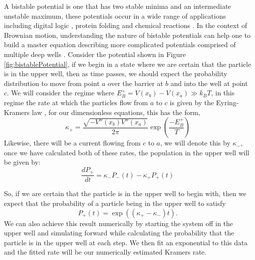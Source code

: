 A bistable potential is one that has two stable minima and an intermediate unstable maximum, these potentials occur in a wide range of applications including digital logic \cite{MyersCelebranoKrishnan2015}, protein folding \cite{BryngelsonWolynes1989} and chemical reactions \cite{BernePecora1976}. In the context of Brownian motion, understanding the nature of bistable potentials can help one to build a master equation describing more complicated potentials comprised of multiple deep wells \cite{Barcilon1996, ChallisJack2014}. Consider the potential shown in Figure \ref{fig:bistablePotential}, if we begin in a state where we are certain that the particle is in the upper well, then as time passes, we should expect the probability distribution to move from point $a$ over the barrier at $b$ and into the well at point $c$. We will consider the regime where $E^+_B = V(x_b) - V(x_a) \gg k_B T$, in this regime the rate at which the particles flow from $a$ to $c$ is given by the Eyring-Kramers law \cite{Eyring1935, Kramers1940}, for our dimensionless equations, this has the form,
\begin{equation}
\kappa_+ = \frac{\sqrt{-V''(x_b) V''(x_a)}}{2 \pi} \exp \left({\frac{-E^+_B}{T}} \right)
\end{equation}
Likewise, there will be a current flowing from $c$ to $a$, we will denote this by $\kappa_-$, once we have calculated both of these rates, the population in the upper well will be given by:
\begin{equation}
\frac{d P_+}{d t} = \kappa_- P_-(t) - \kappa_+ P_+(t)
\end{equation}

So, if we are certain that the particle is in the upper well to begin with, then we expect that the probability of a particle being in the upper well to satisfy
\begin{equation}
P_+(t) = \exp{((\kappa_+ - \kappa_- )t)}.
\end{equation}
We can also achieve this result numerically by starting the system off in the upper well and simulating forward while calculating the probability that the particle is in the upper well at each step. We then fit an exponential to this data and the fitted rate will be our numerically estimated Kramers rate.
